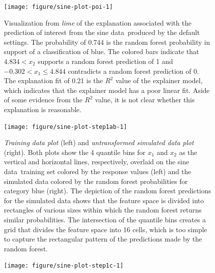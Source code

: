 \documentclass[AMS,STIX2COL]{WileyNJD-v2}\usepackage[]{graphicx}\usepackage[]{color}
\newenvironment{knitrout}{}{} %
\newcommand{\data}{sine data}
\begin{document}
{\begin{figure}[!htbp]
\centering
\begin{knitrout}
\color{fgcolor}
\texttt{[image: figure/sine-plot-poi-1]} 

\end{knitrout}
\caption{Visualization from \emph{lime} of the explanation associated with the prediction of interest from the \data \ produced by the default settings. The probability of 0.744 is the random forest probability in support of a classification of blue. The colored bars indicate that $4.834 < x_2$ supports a random forest prediction of 1 and $-0.302<x_1\le 4.844$ contradicts a random forest prediction of 0. The explanation fit of 0.21 is the $R^2$ value of the explainer model, which indicates that the explainer model has a poor linear fit. Aside of some evidence from the $R^2$ value, it is not clear whether this explanation is reasonable.}
\label{fig:sine-plot-poi}
\end{figure}

\begin{figure}[!htbp]
\centering
\begin{knitrout}
\color{fgcolor}
\texttt{[image: figure/sine-plot-step1ab-1]} 

\end{knitrout}
\caption{\emph{Training data plot} (left) and \emph{untransformed simulated data plot} (right). Both plots show the 4 quantile bins for $x_1$ and $x_2$ as the vertical and horizontal lines, respectively, overlaid on the \data \ training set colored by the response values (left) and the simulated data colored by the random forest probabilities for category blue (right). The depiction of the random forest predictions for the simulated data shows that the feature space is divided into rectangles of various sizes within which the random forest returns similar probabilities. The intersection of the quantile bins creates a grid that divides the feature space into 16 cells, which is too simple to capture the rectangular pattern of the predictions made by the random forest.}
\label{fig:sine-plot-step1ab}
\end{figure}



\begin{figure}[!htbp]
\centering
\begin{knitrout}
\color{fgcolor}
\texttt{[image: figure/sine-plot-step1c-1]} 


\end{knitrout}
\end{figure}}
\end{document}
